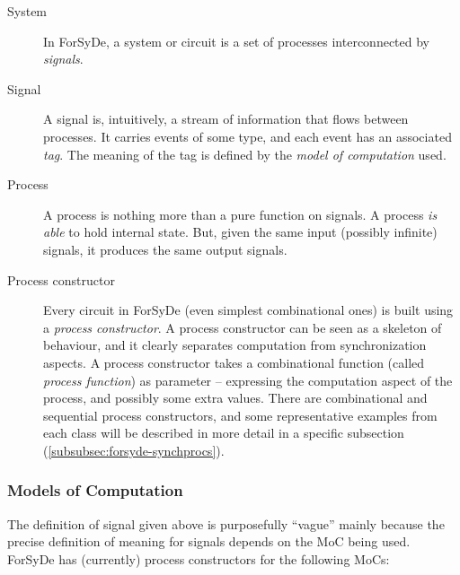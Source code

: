         \begin{description}
            \item[System] In ForSyDe, a system or circuit is a set of processes interconnected by
                \emph{signals}.

            \item[Signal] A signal is, intuitively, a stream of information that flows between
                processes. It carries events of some type, and each event has an associated
                \emph{tag}. The meaning of the tag is defined by the \emph{model of computation}
                used.

            \item[Process] A process is nothing more than a pure function on signals. A process
                \emph{is able} to hold internal state. But, given the same input (possibly infinite)
                signals, it produces the same output signals.

            \item[Process constructor] Every circuit in ForSyDe (even simplest combinational ones) is
                built using a \emph{process constructor}. A process constructor can be seen as a
                skeleton of behaviour, and it clearly separates computation from synchronization
                aspects. A process constructor takes a combinational function (called \emph{process
                    function}) as parameter -- expressing the computation aspect of the process, and
                possibly some extra values. There are combinational and sequential process
                constructors, and some representative examples from each class will be described in
                more detail in a specific subsection (\ref{subsubsec:forsyde-synchprocs}).
        \end{description}

        \subsubsection{Models of Computation}
        \label{subsubsec:forsyde-mocs}
            The definition of signal given above is purposefully ``vague'' mainly because the
            precise definition of meaning for signals depends on the \ac{MoC} being used.
            ForSyDe has (currently) process constructors for the following \acp{MoC}:

